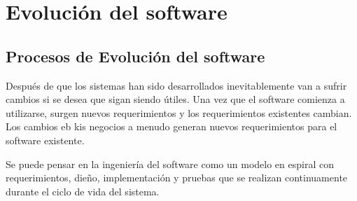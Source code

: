 \section{Evolución del software}
\subsection{Procesos de Evolución del software}
Después de que los sistemas han sido desarrollados inevitablemente van a sufrir cambios si se desea que sigan siendo útiles. Una vez que el software comienza a utilizarse, surgen nuevos requerimientos y los requerimientos existentes cambian. Los cambios eb kis negocios a menudo generan nuevos requerimientos para el software existente.\par
Se puede pensar en la ingeniería del software como un modelo en espiral con requerimientos, dieño, implementación y pruebas que se realizan continuamente durante el ciclo de vida del sistema.
